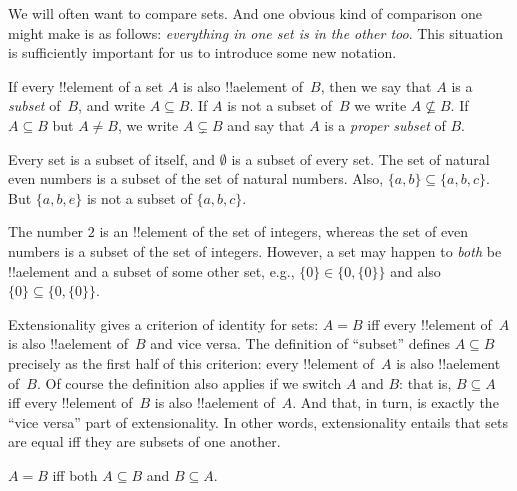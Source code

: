 \documentclass[../../../include/open-logic-section]{subfiles}
\begin{document}

\begin{explain}
We will often want to compare sets. And one obvious kind of comparison
one might make is as follows: \emph{everything in one set is in the
other too}. This situation is sufficiently important for us to
introduce some new notation.
\end{explain}

\begin{defn}[Subset]
If every !!{element} of a set $A$ is also !!a{element} of~$B$, then we
say that $A$ is a \emph{subset} of~$B$, and write $A \subseteq B$. If
$A$ is not a subset of~$B$ we write $A \not\subseteq B$.
If $A \subseteq B$ but $A \neq B$, we write $A \subsetneq B$ and say
that $A$ is a \emph{proper subset} of $B$.
\end{defn}

\begin{ex}
Every set is a subset of itself, and $\emptyset$ is a subset of every
set. The set of natural even numbers is a subset of the set of natural
numbers. Also, $\{ a, b \} \subseteq \{ a, b, c \}$. But $\{ a, b, e
\}$ is not a subset of $\{ a, b, c \}$.
\end{ex}

\begin{ex}
The number $2$ is an !!{element} of the set of integers, whereas the
set of even numbers is a subset of the set of integers. However, a set
may happen to \emph{both} be !!a{element} and a subset of some other
set, e.g., $\{0\} \in \{0, \{0\}\}$ and also $\{0\} \subseteq \{0,
\{0\}\}$.
\end{ex}

Extensionality gives a criterion of identity for sets: $A = B$ iff
every !!{element} of~$A$ is also !!a{element} of~$B$ and vice versa.
The definition of ``subset'' defines $A \subseteq B$ precisely as the
first half of this criterion: every !!{element} of~$A$ is also
!!a{element} of~$B$. Of course the definition also applies if we
switch $A$ and $B$: that is, $B \subseteq A$ iff every !!{element}
of~$B$ is also !!a{element} of~$A$. And that, in turn, is exactly the
``vice versa'' part of extensionality. In other words, extensionality
entails that sets are equal iff they are subsets of one another.

\begin{prop}
$A = B$ iff both $A \subseteq B$ and $B \subseteq A$.
\end{prop}
\end{document}
